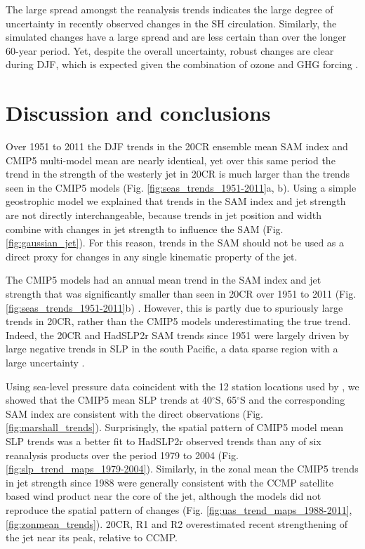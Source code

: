 \documentclass{ametsoc}
\begin{document}
The large spread amongst the reanalysis trends indicates the large degree of uncertainty in 
recently observed changes in the SH circulation. Similarly, the simulated changes have a 
large spread and are less certain than over the longer 60-year period. Yet, despite the overall 
uncertainty, robust changes are clear during DJF, which is expected given the combination
of ozone and GHG forcing \citep{Son_et_al_2010}. 

\section{Discussion and conclusions} \label{sec:conclusions}
Over 1951 to 2011 the DJF trends in the 20CR ensemble mean SAM index and CMIP5 multi-model 
mean are nearly identical, yet over this same period the trend in the strength of the westerly jet in
20CR is much larger than the trends seen in the CMIP5 models (Fig. \ref{fig:seas_trends_1951-2011}a, b). 
Using a simple geostrophic
model we explained that trends in the SAM index and jet strength are not directly
interchangeable, because trends in jet position and width combine with changes in jet strength
to influence the SAM (Fig. \ref{fig:gaussian_jet}). For this reason, trends in the SAM should not be used as a direct
proxy for changes in any single kinematic property of the jet.

The CMIP5 models had an annual mean trend in the SAM index and jet strength
that was significantly smaller than seen in 20CR over 1951 to 2011 
(Fig. \ref{fig:seas_trends_1951-2011}b) . However, 
this is partly due to spuriously large trends in 20CR, rather than 
the CMIP5 models underestimating the true trend. Indeed, the 20CR and 
HadSLP2r SAM trends since 1951 were largely driven by 
large negative trends in SLP in the south Pacific, a data sparse region
with a large uncertainty \citep[Fig. \ref{fig:20CR_uncertainty_map};][]{Allan_and_Ansell_2006}. 

Using sea-level pressure data coincident with the 12 station locations used
by \citet {Marshall_2003}, we showed that the CMIP5 mean SLP trends 
at 40$^{\circ}$S, 65$^{\circ}$S 
and the corresponding SAM index are consistent with the direct
observations (Fig. \ref{fig:marshall_trends}). Surprisingly, the spatial pattern of
CMIP5 model mean SLP trends was a better fit to HadSLP2r observed trends than any of six 
reanalysis products over the period 1979 to 2004 (Fig. \ref{fig:slp_trend_maps_1979-2004}). 
Similarly, in the zonal mean
the CMIP5 trends in jet strength since 1988 were generally consistent with the 
CCMP satellite based wind product near the core of the jet, although the models
did not reproduce the spatial pattern of changes (Fig. \ref{fig:uas_trend_maps_1988-2011}, \ref{fig:zonmean_trends}). 
20CR, R1 and R2 overestimated recent strengthening of the jet near its peak, relative to CCMP. 
\end{document}

